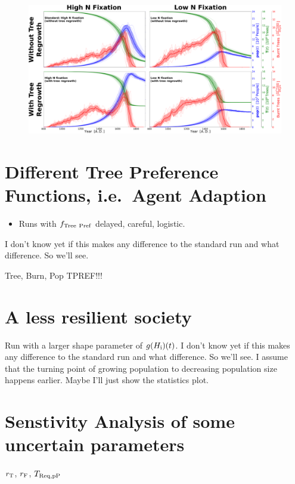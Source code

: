 \begin{figure}
	\centering
	\includegraphics[width=1.3\textwidth, center]{images/Results/Standard/EnsembleStatistics_allTheories}
	\caption{}
	\label{fig:ensemblestatisticsalltheories}
\end{figure}



\section{Different Tree Preference Functions, i.e.\ Agent Adaption}
\begin{itemize}
	\item Runs with $f_{\rm Tree \ Pref}$ delayed, careful, logistic.
\end{itemize}
I don't know yet if this makes any difference to the standard run and what difference. So we'll see.

Tree, Burn, Pop TPREF!!!


\section{A less resilient society}
Run with a larger shape parameter of $g(H_{\rm i})(t)$.
I don't know yet if this makes any difference to the standard run and what difference. So we'll see.
I assume that the turning point of growing population to decreasing population size happens earlier. Maybe I'll just show the statistics plot.


\section{Senstivity Analysis of some uncertain parameters}
$r_{\rm T}$, $r_{\rm F}$,
$T_{\rm Req, pP}$

